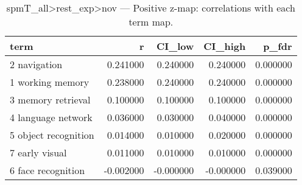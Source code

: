 \begin{table}
\caption{spmT_all>rest_exp>nov — Positive z-map: correlations with each term map.}
\label{tab:spmT_all>rest_exp>nov_pos}
\begin{tabular}{lrrrr}
\toprule
term & r & CI\_low & CI\_high & p\_fdr \\
\midrule
2 navigation & 0.241000 & 0.240000 & 0.240000 & 0.000000 \\
1 working memory & 0.238000 & 0.240000 & 0.240000 & 0.000000 \\
3 memory retrieval & 0.100000 & 0.100000 & 0.100000 & 0.000000 \\
4 language network & 0.036000 & 0.030000 & 0.040000 & 0.000000 \\
5 object recognition & 0.014000 & 0.010000 & 0.020000 & 0.000000 \\
7 early visual & 0.011000 & 0.010000 & 0.010000 & 0.000000 \\
6 face recognition & -0.002000 & -0.000000 & -0.000000 & 0.039000 \\
\bottomrule
\end{tabular}
\end{table}
